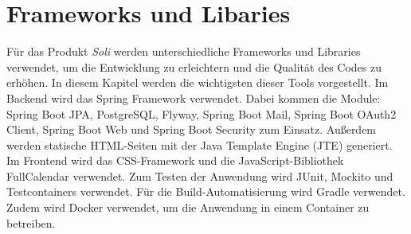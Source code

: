 \chapter{Frameworks und Libaries}
\label{ch:frameworks_libaries}

Für das Produkt \textit{Soli} werden unterschiedliche Frameworks und Libraries verwendet, um die Entwicklung zu erleichtern und die Qualität des Codes zu erhöhen. In diesem Kapitel werden die wichtigsten dieser Tools vorgestellt.
Im Backend wird das Spring Framework verwendet. Dabei kommen die Module: Spring Boot JPA, PostgreSQL, Flyway, Spring Boot Mail, Spring Boot OAuth2 Client, Spring Boot Web und Spring Boot Security zum Einsatz. Außerdem werden statische \gls{HTML}-Seiten mit der Java Template Engine (JTE) generiert. Im Frontend wird das \gls{CSS}-Framework und die JavaScript-Bibliothek \gls{FullCalendar} verwendet.
Zum Testen der Anwendung wird JUnit, Mockito und Testcontainers verwendet.
Für die Build-Automatisierung wird Gradle verwendet.
Zudem wird Docker verwendet, um die Anwendung in einem Container zu betreiben.